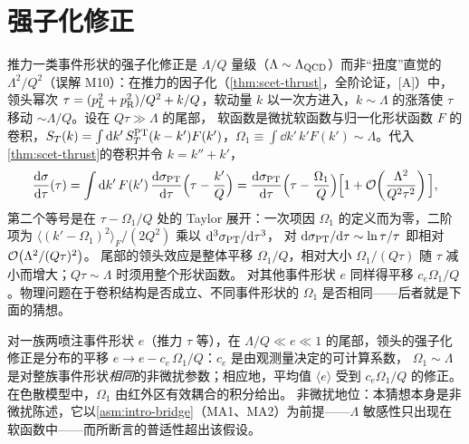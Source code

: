 \section{强子化修正}\label{sec:jets-hadronization}

推力一类事件形状的强子化修正是 $\Lambda/Q$ 量级（$\Lambda\sim\Lambda_{\mathrm{QCD}}$）而非“扭度”直觉的 $\Lambda^2/Q^2$（误解 M10）：在推力的因子化（\cref{thm:scet-thrust}，全阶论证，[A]）中，
领头幂次 $\tau=(p_{\rm L}^2+p_{\rm R}^2)/Q^2+k/Q$，软动量 $k$ 以一次方进入，$k\sim\Lambda$ 的涨落使 $\tau$ 移动 $\sim\Lambda/Q$。设在 $Q\tau\gg\Lambda$ 的尾部，
软函数是微扰软函数与归一化形状函数 $F$ 的卷积，$S_T(k)=\int\mathrm{d} k'\,S_T^{\rm PT}(k-k')F(k')$，$\Omega_1\equiv\int\dd k'\,k'F(k')\sim\Lambda$。代入\cref{thm:scet-thrust}的卷积并令 $k=k''+k'$，
\begin{equation}\label{eq:jets-shift-derivation}
\frac{\mathrm{d}\sigma}{\mathrm{d}\tau}(\tau)=\int\mathrm{d} k'\,F(k')\,\frac{\mathrm{d}\sigma_{\rm PT}}{\mathrm{d}\tau}\Big(\tau-\frac{k'}{Q}\Big)
=\frac{\mathrm{d}\sigma_{\rm PT}}{\mathrm{d}\tau}\Big(\tau-\frac{\Omega_1}{Q}\Big)\Big[1+\mathcal{O}\!\left(\frac{\Lambda^2}{Q^2\tau^2}\right)\Big],
\end{equation}
第二个等号是在 $\tau-\Omega_1/Q$ 处的 Taylor 展开：一次项因 $\Omega_1$ 的定义而为零，二阶项为 $\langle(k'-\Omega_1)^2\rangle_F/(2Q^2)$ 乘以 $\mathrm{d}^3\sigma_{\rm PT}/\mathrm{d}\tau^3$，
对 $\mathrm{d}\sigma_{\rm PT}/\mathrm{d}\tau\sim\ln\tau/\tau$ 即相对 $\mathcal{O}\!\left(\Lambda^2/(Q\tau)^2\right)$。
尾部的领头效应是整体平移 $\Omega_1/Q$，相对大小 $\Omega_1/(Q\tau)$ 随 $\tau$ 减小而增大；$Q\tau\sim\Lambda$ 时须用整个形状函数\cite{Korchemsky:1999kt,Bauer:2003di}。
对其他事件形状 $e$ 同样得平移 $c_e\Omega_1/Q$。物理问题在于卷积结构是否成立、不同事件形状的 $\Omega_1$ 是否相同——后者就是下面的猜想。

\begin{conjecture}\label{conj:jets-hadronization}
对一族两喷注事件形状 $e$（推力 $\tau$ 等），在 $\Lambda/Q\ll e\ll1$ 的尾部，领头的强子化修正是分布的平移 $e\to e-c_e\,\Omega_1/Q$：$c_e$ 是由观测量决定的可计算系数，
$\Omega_1\sim\Lambda$ 是对整族事件形状\emph{相同}的非微扰参数；相应地，平均值 $\langle e\rangle$ 受到 $c_e\Omega_1/Q$ 的修正。在色散模型中，$\Omega_1$ 由红外区有效耦合的积分给出\cite{DokshitzerWebber1995}。
非微扰地位：本猜想本身是非微扰陈述，它以\cref{asm:intro-bridge}（MA1、MA2）为前提——$\Lambda$ 敏感性只出现在软函数中——而所断言的普适性超出该假设。
\end{conjecture}


